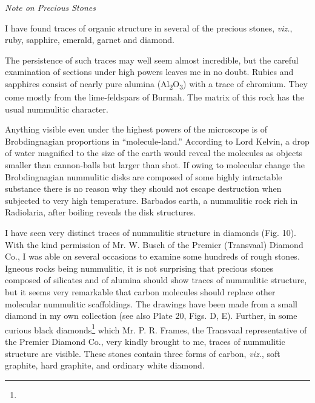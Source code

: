 \documentclass[a4paper, 12pt, oneside]{article}
\begin{document}
\centerline{\emph{Note on Precious Stones}}

I have found traces of organic structure in several of the precious stones, \emph{viz.}, ruby, sapphire, emerald, garnet and diamond.

The persistence of such traces may well seem almost incredible, but the careful examination of sections under high powers leaves me in no doubt. Rubies and sapphires consist of nearly pure alumina (Al\textsubscript{2}O\textsubscript{3}) with a trace of chromium. They come mostly from the lime-feldspars of Burmah. The matrix of this rock has the usual nummulitic character.

Anything visible even under the highest powers of the microscope is of Brobdingnagian proportions in ``molecule-land.'' According to Lord Kelvin, a drop of water magnified to the size of the earth would reveal the molecules as objects smaller than cannon-balls but larger than shot. If owing to molecular change the Brobdingnagian nummulitic disks are composed of some highly intractable substance there is no reason why they should not escape destruction when subjected to very high temperature. Barbados earth, a nummulitic rock rich in Radiolaria, after boiling reveals the disk structures.

I have seen very distinct traces of nummulitic structure in diamonds (Fig. 10). With the kind permission of Mr. W. Busch of the Premier (Transvaal) Diamond Co., I was able on several occasions to examine some hundreds of rough stones. Igneous rocks being nummulitic, it is not surprising that precious stones composed of silicates and of alumina should show traces of nummulitic structure, but it seems very remarkable that carbon molecules should replace other molecular nummulitic scaffoldings. The drawings have been made from a small diamond in my own collection (see also Plate 20, Figs. D, E). Further, in some curious black diamonds\footnote{} which Mr. P. R. Frames, the Transvaal representative of the Premier Diamond Co., very kindly brought to me, traces of nummulitic structure are visible. These stones contain three forms of carbon, \emph{viz.}, soft graphite, hard graphite, and ordinary white diamond.
\end{document}
